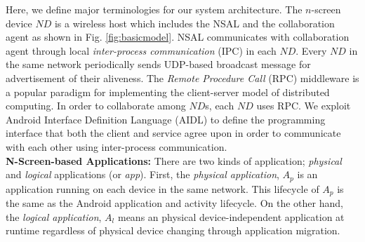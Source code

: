 \documentclass[conference]{IEEEtran}
\begin{document}

Here, we define major terminologies for our system architecture. The $n$-screen device $ND$ is a wireless host which includes the NSAL and the collaboration agent as shown in Fig. \ref{fig:basicmodel}. NSAL communicates with collaboration agent through local \textit{inter-process communication} (IPC) in each $ND$.  Every $ND$ in the same network periodically sends UDP-based broadcast message for advertisement of their aliveness.
The \textit{Remote Procedure Call} (RPC) middleware is a popular paradigm for implementing the client-server model of distributed computing.  In order to collaborate among $ND$s, each $ND$ uses RPC.  
We exploit Android Interface Definition Language (AIDL)  to define the programming interface that both the client and service agree upon in order to communicate with each other using inter-process communication. 
\\

\noindent
\textbf{N-Screen-based Applications: }
There are two kinds of application; \textit{physical} and \textit{logical} applications (or \textit{app}).
First, the \textit{physical application}, $A_p$ is an application running on each device in the same network.  
This lifecycle of  $A_p$ is the same as the Android application and activity lifecycle.
On the other hand, the \textit{logical application}, $A_l$ means an physical device-independent application at runtime regardless of physical device changing through application migration.
\end{document}
